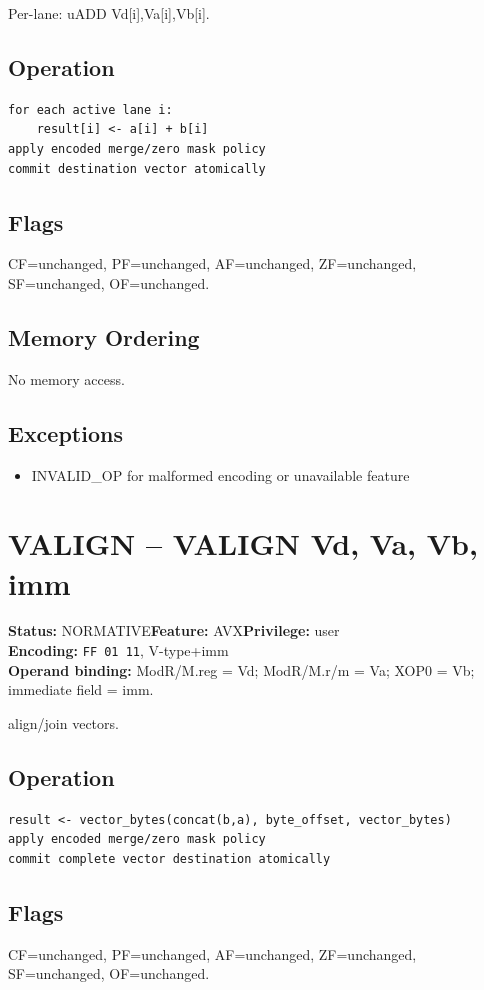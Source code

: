 \documentclass[10pt]{article}
\begin{document}
Per-lane: uADD Vd[i],Va[i],Vb[i].

\subsection*{Operation}
\begin{lstlisting}
for each active lane i:
    result[i] <- a[i] + b[i]
apply encoded merge/zero mask policy
commit destination vector atomically
\end{lstlisting}
\subsection*{Flags}
CF=unchanged, PF=unchanged, AF=unchanged, ZF=unchanged, SF=unchanged, OF=unchanged.
\subsection*{Memory Ordering}
No memory access.
\subsection*{Exceptions}
\begin{itemize}
\item INVALID\_OP for malformed encoding or unavailable feature
\end{itemize}
\clearpage

\section{VALIGN -- VALIGN Vd, Va, Vb, imm}
\textbf{Status:} NORMATIVE\quad \textbf{Feature:} AVX\quad \textbf{Privilege:} user\\
\textbf{Encoding:} \texttt{FF 01 11}, V-type+imm\\
\textbf{Operand binding:} ModR/M.reg = Vd; ModR/M.r/m = Va; XOP0 = Vb; immediate field = imm.

align/join vectors.

\subsection*{Operation}
\begin{lstlisting}
result <- vector_bytes(concat(b,a), byte_offset, vector_bytes)
apply encoded merge/zero mask policy
commit complete vector destination atomically
\end{lstlisting}
\subsection*{Flags}
CF=unchanged, PF=unchanged, AF=unchanged, ZF=unchanged, SF=unchanged, OF=unchanged.
\end{document}
